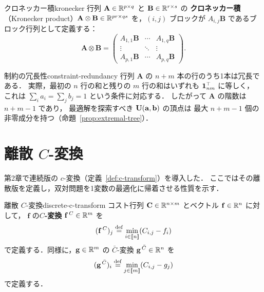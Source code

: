 \begin{definition}{クロネッカー積}{kronecker}
  行列 $\mathbf{A} \in \mathbb{R}^{p \times q}$ と $\mathbf{B} \in \mathbb{R}^{r \times s}$ の
  \textbf{クロネッカー積}（Kronecker product）$\mathbf{A} \otimes \mathbf{B} \in \mathbb{R}^{pr \times qs}$
  を，$(i, j)$ ブロックが $A_{i,j} \mathbf{B}$ であるブロック行列として定義する：
  \[
    \mathbf{A} \otimes \mathbf{B} =
    \begin{pmatrix}
      A_{1,1}\mathbf{B} & \cdots & A_{1,q}\mathbf{B} \\
      \vdots & \ddots & \vdots \\
      A_{p,1}\mathbf{B} & \cdots & A_{p,q}\mathbf{B}
    \end{pmatrix}.
  \]
\end{definition}

\begin{remark}{制約の冗長性}{constraint-redundancy}
  行列 $\mathbf{A}$ の $n + m$ 本の行のうち1本は冗長である．
  実際，最初の $n$ 行の和と残りの $m$ 行の和はいずれも $\mathbf{1}_{nm}^\top$ に等しく，
  これは $\sum_i a_i = \sum_j b_j = 1$ という条件に対応する．
  したがって $\mathbf{A}$ の階数は $n + m - 1$ であり，
  最適解を探索すべき $\mathbf{U}(\mathbf{a}, \mathbf{b})$ の頂点は
  最大 $n + m - 1$ 個の非零成分を持つ（命題~\ref{prop:extremal-tree}）．
\end{remark}

\section{離散 $C$-変換}
\label{sec:discrete-c-transform}

第2章で連続版の $c$-変換（定義~\ref{def:c-transform}）を導入した．
ここではその離散版を定義し，双対問題を1変数の最適化に帰着させる性質を示す．

\begin{definition}{離散 $C$-変換}{discrete-c-transform}
  コスト行列 $\mathbf{C} \in \mathbb{R}^{n \times m}$ とベクトル $\mathbf{f} \in \mathbb{R}^n$ に対して，
  $\mathbf{f}$ の\textbf{$C$-変換} $\mathbf{f}^{\,C} \in \mathbb{R}^m$ を
  \[
    (\mathbf{f}^{\,C})_j \overset{\mathrm{def}}{=} \min_{i \in \llbracket n \rrbracket} (C_{i,j} - f_i)
  \]
  で定義する．同様に，$\mathbf{g} \in \mathbb{R}^m$ の $\bar{C}$-変換 $\mathbf{g}^{\,\bar{C}} \in \mathbb{R}^n$ を
  \[
    (\mathbf{g}^{\,\bar{C}})_i \overset{\mathrm{def}}{=} \min_{j \in \llbracket m \rrbracket} (C_{i,j} - g_j)
  \]
  で定義する．
\end{definition}

